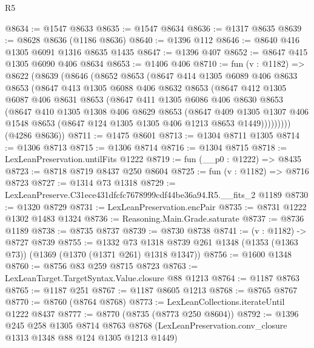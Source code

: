 \begin{lexlean}{R5}
\begin{coremodule}
@8634 := @1547 @8633
@8635 := @1547 @8634
@8636 := @1317 @8635
@8639 := @8628 @8636 (@1186 @8636)
@8640 := @1396 @112
@8646 := @8640 @416 @1305 @6091 @1316 @8635 @1435
@8647 := @1396 @407
@8652 := @8647 @415 @1305 @6090 @406 @8634
@8653 := @1406 @406
@8710 := fun (v : @1182) =>
  @8622
    (@8639
      (@8646
        (@8652
          @8653
          (@8647
            @414
            @1305
            @6089
            @406
            @8633
            @8653
            (@8647
              @413
              @1305
              @6088
              @406
              @8632
              @8653
              (@8647
                @412
                @1305
                @6087
                @406
                @8631
                @8653
                (@8647
                  @411
                  @1305
                  @6086
                  @406
                  @8630
                  @8653
                  (@8647
                    @410
                    @1305
                    @1308
                    @406
                    @8629
                    @8653
                    (@8647
                      @409
                      @1305
                      @1307
                      @406
                      @1548
                      @8653
                      (@8647 @124 @1305 @1305 @406 @1213 @8653 @1449)))))))))
      (@4286 @8636))
@8711 := @1475 @8601
@8713 := @1304 @8711 @1305
@8714 := @1306 @8713
@8715 := @1306 @8714
@8716 := @1304 @8715
@8718 := LexLeanPreservation.untilFits @1222
@8719 := fun (__p0 : @1222) => @8435
@8723 := @8718 @8719 @8437 @250 @8604
@8725 := fun (v : @1182) => @8716 @8723
@8727 := @1314 @73 @1318
@8729 := LexLeanPreserve.C31ece431dfcfc7678999cdf44be36a94.R5.__fits_2 @1189
@8730 := @1320 @8729
@8731 := LexLeanPreservation.encPair
@8735 := @8731 @1222 @1302 @1483 @1324
@8736 := Reasoning.Main.Grade.saturate
@8737 := @8736 @1189
@8738 := @8735 @8737
@8739 := @8730 @8738
@8741 := (v : @1182) -> @8727 @8739
@8755 := @1332
    @73
    @1318
    @8739
    @261
    @1348
    (@1353 (@1363 @73))
    (@1369 (@1370 (@1371 @261) @1318 @1347))
@8756 := @1600 @1348
@8760 := @8756 @83 @259 @8715 @8723
@8763 := LexLeanTarget.TargetSyntax.Value.closure @88 @1213
@8764 := @1187 @8763
@8765 := @1187 @251
@8767 := @1187 @8605 @1213
@8768 := @8765 @8767
@8770 := @8760 (@8764 @8768)
@8773 := LexLeanCollections.iterateUntil @1222 @8437
@8777 := @8770 (@8735 (@8773 @250 @8604))
@8792 := @1396
    @245
    @258
    @1305
    @8714
    @8763
    @8768
    (LexLeanPreservation.conv_closure @1313 @1348 @88 @124 @1305 @1213 @1449)

\end{coremodule}
\end{lexlean}
